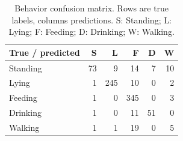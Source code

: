 \begin{table}[htbp]
\centering\small
\caption[Behavior test confusion matrix]{Behavior confusion matrix. Rows are true labels, columns predictions. S: Standing; L: Lying; F: Feeding; D: Drinking; W: Walking.}\label{tab:behcm}
\begin{tabular}{lrrrrr}
\toprule
True / predicted & S & L & F & D & W \\
\midrule
Standing & 73 & 9 & 14 & 7 & 10 \\
Lying & 1 & 245 & 10 & 0 & 2 \\
Feeding & 1 & 0 & 345 & 0 & 3 \\
Drinking & 1 & 0 & 11 & 51 & 0 \\
Walking & 1 & 1 & 19 & 0 & 5 \\
\bottomrule
\end{tabular}
\end{table}
